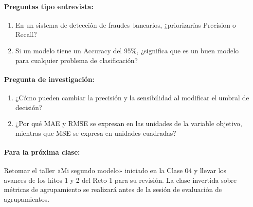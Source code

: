 \documentclass[a4,11pt]{aleph-notas}
\begin{document}
\paragraph{Preguntas tipo entrevista:} 
\begin{enumerate}[leftmargin=*]
    \item En un sistema de detección de fraudes bancarios, ¿priorizarías Precision o Recall? 
    
    \item Si un modelo tiene un Accuracy del 95\%, ¿significa que es un buen modelo para cualquier problema de clasificación?
\end{enumerate}

\paragraph{Pregunta de investigación:} 
\begin{enumerate}[leftmargin=*]
    \item ¿Cómo pueden cambiar la precisión y la sensibilidad al modificar el umbral de decisión?
    \item ¿Por qué MAE y RMSE se expresan en las unidades de la variable objetivo, mientras que MSE se expresa en unidades cuadradas?
\end{enumerate}
    
\paragraph{Para la próxima clase:} Retomar el taller «Mi segundo modelo» iniciado en la Clase 04 y llevar los avances de los hitos 1 y 2 del Reto 1 para su revisión. La clase invertida sobre métricas de agrupamiento se realizará antes de la sesión de evaluación de agrupamientos.
\end{document}
